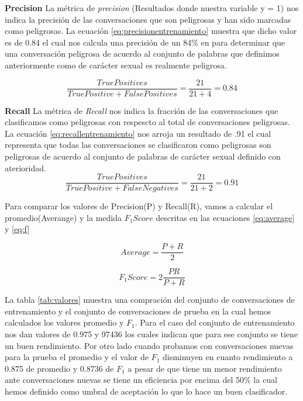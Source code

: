 \textbf{Precision} \linebreak
La m\'etrica de \textit{precision} (Resultados donde nuestra variable y = 1) nos indica la precisi\'on de las conversaciones que son peligrosas y han sido marcadas como peligrosas. La ecuaci\'on \ref{eq:precisionentrenamiento} muestra que dicho valor es de 0.84 el cual nos calcula una precisi\'on de un 84\% en para determinar que una conversaci\'on peligrosa de acuerdo al conjunto de palabras que definimos anteriormente como de car\'acter sexual es realmente peligrosa.

\begin{equation}\label{eq:precisionentrenamiento}
\frac{TruePositives}{TruePositive + FalsePositives} = \frac{21}{21+4} = 0.84
\end{equation}

\textbf{Recall} \linebreak
La m\'etrica de \textit{Recall} nos indica la fracci\'on de las conversaciones que clasificamos como peligrosas con respescto al total de conversaciones peligrosas. La ecuaci\'on \ref{eq:recallentrenamiento} nos arroja un resultado de .91 el cual representa que todas las conversaciones se clasificaron como peligrosas son peligrosas de acuerdo al conjunto de palabras de car\'acter sexual definido con aterioridad.
\begin{equation}\label{eq:recallentrenamiento}
\frac{TruePositives}{TruePositive + FalseNegatives} = \frac{21}{21+2} = 0.91
\end{equation}


Para comparar los valores de Precision(P) y Recall(R), vamos a calcular el promedio(Averange) y la medida $F_1 Score$ descritas en las ecuaciones \ref{eq:average} y \ref{eq:f}

\begin{equation}\label{eq:average}
	Average = \frac{P + R}{2}
\end{equation}

\begin{equation}\label{eq:f}
	F_1 Score = 2 \frac{PR}{P + R}
\end{equation}


La tabla \ref{tab:valores} muestra una compraci\'on del conjunto de conversaciones de entrenamiento y el conjunto de conversaciones de prueba en la cual hemos calculados los valores promedio y $F_1$. Para el caso del conjunto de entrenamiento nos dan valores de 0.975 y 97436 los cuales indican que para ese conjunto se tiene un buen rendimiento. Por otro lado cuando probamos con conversaciones nuevas para la prueba el promedio y el valor de $F_1$ disminuyen en cuanto rendimiento a  0.875 de promedio y 0.8736 de $F_1$ a pesar de que tiene un menor rendimiento ante conversaciones nuevas se tiene un eficiencia por encima del 50\% la cual hemos definido como umbral de aceptaci\'on lo que lo hace un buen clasificador. 

